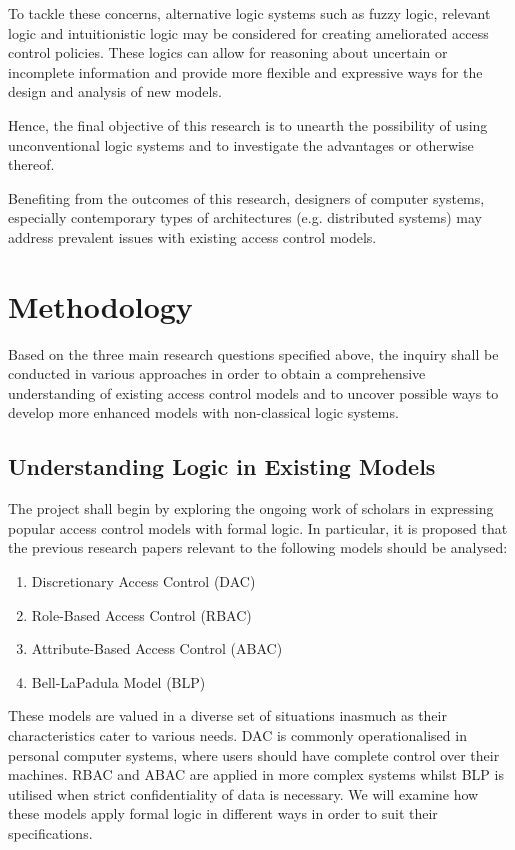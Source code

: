 \documentclass{article}
\begin{document}
To tackle these concerns, alternative logic systems such as fuzzy logic, relevant logic and intuitionistic logic may be considered for creating ameliorated access control policies. These logics can allow for reasoning about uncertain or incomplete information and provide more flexible and expressive ways for the design and analysis of new models.

Hence, the final objective of this research is to unearth the possibility of using unconventional logic systems and to investigate the advantages or otherwise thereof.

Benefiting from the outcomes of this research, designers of computer systems, especially contemporary types of architectures (e.g. distributed systems) may address prevalent issues with existing access control models.

\section*{Methodology}

Based on the three main research questions specified above, the inquiry shall be conducted in various approaches in order to obtain a comprehensive understanding of existing access control models and to uncover possible ways to develop more enhanced models with non-classical logic systems.

\subsection*{Understanding Logic in Existing Models}

The project shall begin by exploring the ongoing work of scholars in expressing popular access control models with formal logic. In particular, it is proposed that the previous research papers relevant to the following models should be analysed:
\begin{enumerate}
    \item Discretionary Access Control (DAC)
    \item Role-Based Access Control (RBAC)
    \item Attribute-Based Access Control (ABAC)
    \item Bell-LaPadula Model (BLP)
\end{enumerate}

These models are valued in a diverse set of situations inasmuch as their characteristics cater to various needs. DAC is commonly operationalised in personal computer systems, where users should have complete control over their machines. RBAC and ABAC are applied in more complex systems whilst BLP is utilised when strict confidentiality of data is necessary. We will examine how these models apply formal logic in different ways in order to suit their specifications.
\end{document}
